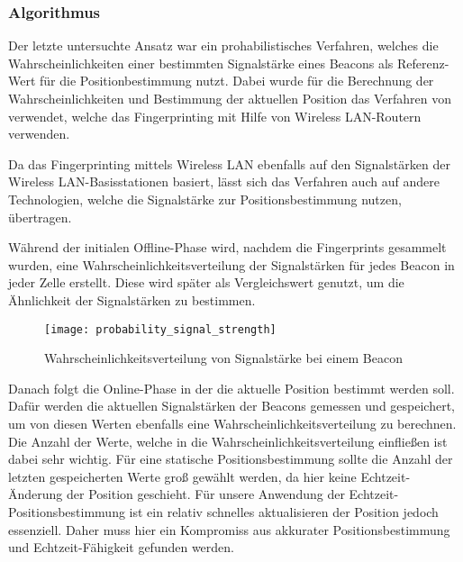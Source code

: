 \subsubsection{Algorithmus}
\label{sec:implementation:fingerprinting:positioning:probability:algorithm}

Der letzte untersuchte Ansatz war ein prohabilistisches Verfahren, welches die Wahrscheinlichkeiten einer bestimmten Signalstärke eines Beacons als Referenz-Wert für die Positionbestimmung nutzt. Dabei wurde für die Berechnung der Wahrscheinlichkeiten und Bestimmung der aktuellen Position das Verfahren von \citet{wifiFingerprintProbability} verwendet, welche das Fingerprinting mit Hilfe von Wireless LAN-Routern verwenden.

Da das Fingerprinting mittels Wireless LAN ebenfalls auf den Signalstärken der Wireless LAN-Basisstationen basiert, lässt sich das Verfahren auch auf andere Technologien, welche die Signalstärke zur Positionsbestimmung nutzen, übertragen.

Während der initialen Offline-Phase wird, nachdem die Fingerprints gesammelt wurden, eine Wahrscheinlichkeitsverteilung der Signalstärken für jedes Beacon in jeder Zelle erstellt. Diese wird später als Vergleichswert genutzt, um die Ähnlichkeit der Signalstärken zu bestimmen.

\begin{figure}[htb!]
		\centering
	\texttt{[image: probability\_signal\_strength]}
	\caption{Wahrscheinlichkeitsverteilung von Signalstärke bei einem Beacon}
	\label{probability-signal-strength-beacon}
\end{figure}

Danach folgt die Online-Phase in der die aktuelle Position bestimmt werden soll. Dafür werden die aktuellen Signalstärken der Beacons gemessen und gespeichert, um von diesen Werten ebenfalls eine Wahrscheinlichkeitsverteilung zu berechnen. Die Anzahl der Werte, welche in die Wahrscheinlichkeitsverteilung einfließen ist dabei sehr wichtig.
Für eine statische Positionsbestimmung sollte die Anzahl der letzten gespeicherten Werte groß gewählt werden, da hier keine Echtzeit-Änderung der Position geschieht.
Für unsere Anwendung der Echtzeit-Positionsbestimmung ist ein relativ schnelles aktualisieren der Position jedoch essenziell. Daher muss hier ein Kompromiss aus akkurater Positionsbestimmung und Echtzeit-Fähigkeit gefunden werden.

